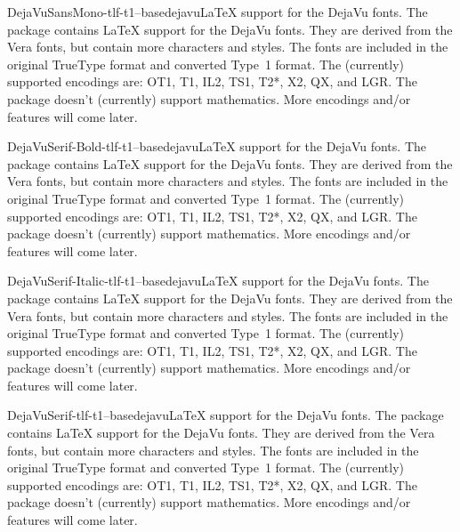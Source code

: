 \documentclass{ddltxtyp}
\begin{document}
\begin{package}{DejaVuSansMono-tlf-t1--base}{dejavu}{{\LaTeX} support for the DejaVu fonts.}
The package contains {\LaTeX} support for the DejaVu fonts. They
are derived from the Vera fonts, but contain more characters
and styles. The fonts are included in the original TrueType
format and converted Type~1 format. The (currently) supported
encodings are: OT1, T1, IL2, TS1, T2*, X2, QX, and LGR. The
package doesn't (currently) support mathematics. More encodings
and/or features will come later.
\end{package}

\begin{package}{DejaVuSerif-Bold-tlf-t1--base}{dejavu}{{\LaTeX} support for the DejaVu fonts.}
The package contains {\LaTeX} support for the DejaVu fonts. They
are derived from the Vera fonts, but contain more characters
and styles. The fonts are included in the original TrueType
format and converted Type~1 format. The (currently) supported
encodings are: OT1, T1, IL2, TS1, T2*, X2, QX, and LGR. The
package doesn't (currently) support mathematics. More encodings
and/or features will come later.
\end{package}


\begin{package}{DejaVuSerif-Italic-tlf-t1--base}{dejavu}{{\LaTeX} support for the DejaVu fonts.}
The package contains {\LaTeX} support for the DejaVu fonts. They
are derived from the Vera fonts, but contain more characters
and styles. The fonts are included in the original TrueType
format and converted Type~1 format. The (currently) supported
encodings are: OT1, T1, IL2, TS1, T2*, X2, QX, and LGR. The
package doesn't (currently) support mathematics. More encodings
and/or features will come later.
\end{package}

\begin{package}{DejaVuSerif-tlf-t1--base}{dejavu}{{\LaTeX} support for the DejaVu fonts.}
The package contains {\LaTeX} support for the DejaVu fonts. They
are derived from the Vera fonts, but contain more characters
and styles. The fonts are included in the original TrueType
format and converted Type~1 format. The (currently) supported
encodings are: OT1, T1, IL2, TS1, T2*, X2, QX, and LGR. The
package doesn't (currently) support mathematics. More encodings
and/or features will come later.
\end{package}
\end{document}
